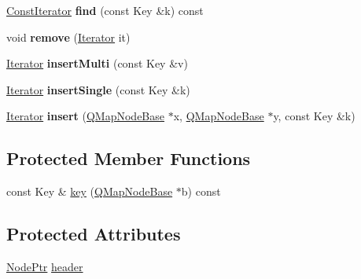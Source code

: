 \begin{DoxyCompactItemize}
\item 
\mbox{\label{class_q_map_private_ad27cf130fd86323896fb2d7a8d3f23b0}} 
\mbox{\hyperlink{class_q_map_const_iterator}{Const\+Iterator}} {\bfseries find} (const Key \&k) const
\item 
\mbox{\label{class_q_map_private_a7f2f689ac684d8577f79e12cab91dbd4}} 
void {\bfseries remove} (\mbox{\hyperlink{class_q_map_private_a5326545ba578532909650c2f4a8d4d34}{Iterator}} it)
\item 
\mbox{\label{class_q_map_private_a5d4b166c2058946aec5335ca777b7949}} 
\mbox{\hyperlink{class_q_map_private_a5326545ba578532909650c2f4a8d4d34}{Iterator}} {\bfseries insert\+Multi} (const Key \&v)
\item 
\mbox{\label{class_q_map_private_a241ba6529b73bda8e8293227837bae76}} 
\mbox{\hyperlink{class_q_map_private_a5326545ba578532909650c2f4a8d4d34}{Iterator}} {\bfseries insert\+Single} (const Key \&k)
\item 
\mbox{\label{class_q_map_private_a5cc8d79a81cca31f59d697a120d7319d}} 
\mbox{\hyperlink{class_q_map_private_a5326545ba578532909650c2f4a8d4d34}{Iterator}} {\bfseries insert} (\mbox{\hyperlink{struct_q_map_node_base}{Q\+Map\+Node\+Base}} $\ast$x, \mbox{\hyperlink{struct_q_map_node_base}{Q\+Map\+Node\+Base}} $\ast$y, const Key \&k)
\end{DoxyCompactItemize}
\subsection*{Protected Member Functions}
\begin{DoxyCompactItemize}
\item 
const Key \& \mbox{\hyperlink{class_q_map_private_a7038ee57f0ed7677e495ee04760f8641}{key}} (\mbox{\hyperlink{struct_q_map_node_base}{Q\+Map\+Node\+Base}} $\ast$b) const
\end{DoxyCompactItemize}
\subsection*{Protected Attributes}
\begin{DoxyCompactItemize}
\item 
\mbox{\hyperlink{struct_q_map_node}{Node\+Ptr}} \mbox{\hyperlink{class_q_map_private_a68a9e07ff34146b090cbac239851139e}{header}}
\end{DoxyCompactItemize}
